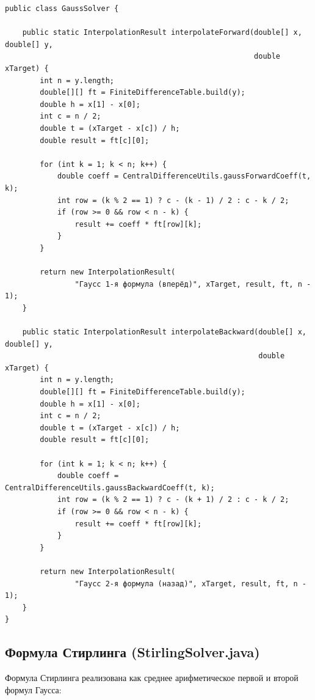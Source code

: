 \begin{lstlisting}[style=javaStyle, label=code:gauss]
public class GaussSolver {

    public static InterpolationResult interpolateForward(double[] x, double[] y,
                                                         double xTarget) {
        int n = y.length;
        double[][] ft = FiniteDifferenceTable.build(y);
        double h = x[1] - x[0];
        int c = n / 2;
        double t = (xTarget - x[c]) / h;
        double result = ft[c][0];

        for (int k = 1; k < n; k++) {
            double coeff = CentralDifferenceUtils.gaussForwardCoeff(t, k);
            int row = (k % 2 == 1) ? c - (k - 1) / 2 : c - k / 2;
            if (row >= 0 && row < n - k) {
                result += coeff * ft[row][k];
            }
        }

        return new InterpolationResult(
                "Гаусс 1-я формула (вперёд)", xTarget, result, ft, n - 1);
    }

    public static InterpolationResult interpolateBackward(double[] x, double[] y,
                                                          double xTarget) {
        int n = y.length;
        double[][] ft = FiniteDifferenceTable.build(y);
        double h = x[1] - x[0];
        int c = n / 2;
        double t = (xTarget - x[c]) / h;
        double result = ft[c][0];

        for (int k = 1; k < n; k++) {
            double coeff = CentralDifferenceUtils.gaussBackwardCoeff(t, k);
            int row = (k % 2 == 1) ? c - (k + 1) / 2 : c - k / 2;
            if (row >= 0 && row < n - k) {
                result += coeff * ft[row][k];
            }
        }

        return new InterpolationResult(
                "Гаусс 2-я формула (назад)", xTarget, result, ft, n - 1);
    }
}
\end{lstlisting}

\subsection{Формула Стирлинга (StirlingSolver.java)}

Формула Стирлинга реализована как среднее арифметическое первой и второй формул Гаусса:

